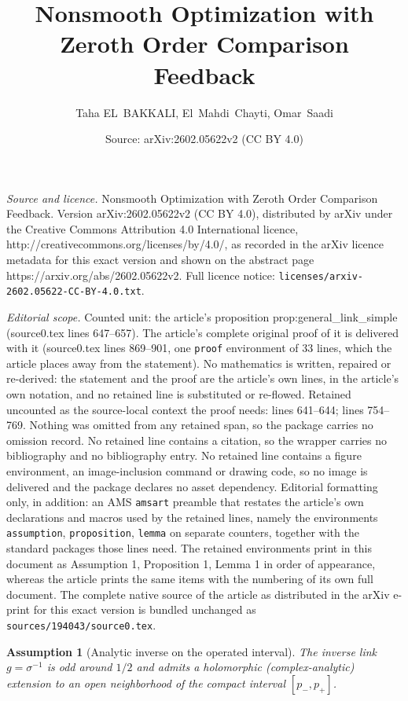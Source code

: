 \documentclass[10pt,a4paper]{amsart}
\title{Nonsmooth Optimization with Zeroth Order Comparison Feedback}
\author{Taha EL~BAKKALI, El~Mahdi~Chayti, Omar~Saadi}
\date{Source: arXiv:2602.05622v2 (CC BY 4.0)}
\newtheorem{assumption}{Assumption}
\begin{document}
\maketitle

\noindent\emph{Source and licence.} Nonsmooth Optimization with Zeroth Order Comparison Feedback. Version arXiv:2602.05622v2 (CC BY 4.0), distributed by arXiv under the Creative Commons Attribution 4.0 International licence, http://creativecommons.org/licenses/by/4.0/, as recorded in the arXiv licence metadata for this exact version and shown on the abstract page https://arxiv.org/abs/2602.05622v2. Full licence notice: \texttt{licenses/arxiv-2602.05622-CC-BY-4.0.txt}.\par\smallskip

\noindent\textit{Editorial scope.} Counted unit: the article's proposition prop:general\_link\_simple (source0.tex lines 647--657). The article's complete original proof of it is delivered with it (source0.tex lines 869--901, one \texttt{proof} environment of 33 lines, which the article places away from the statement). No mathematics is written, repaired or re-derived: the statement and the proof are the article's own lines, in the article's own notation, and no retained line is substituted or re-flowed.  Retained uncounted as the source-local context the proof needs: lines 641--644; lines 754--769.  Nothing was omitted from any retained span, so the package carries no omission record.  No retained line contains a citation, so the wrapper carries no bibliography and no bibliography entry.  No retained line contains a figure environment, an image-inclusion command or drawing code, so no image is delivered and the package declares no asset dependency.  Editorial formatting only, in addition: an AMS \texttt{amsart} preamble that restates the article's own declarations and macros used by the retained lines, namely the environments \texttt{assumption}, \texttt{proposition}, \texttt{lemma} on separate counters, together with the standard packages those lines need.  The retained environments print in this document as Assumption 1, Proposition 1, Lemma 1 in order of appearance, whereas the article prints the same items with the numbering of its own full document.  The complete native source of the article as distributed in the arXiv e-print for this exact version is bundled unchanged as \texttt{sources/194043/source0.tex}.
\begin{assumption}[Analytic inverse on the operated interval]\label{ass:general_link_simple}
The inverse link $g=\sigma^{-1}$ is odd around $1/2$ and admits a holomorphic (complex-analytic) extension
to an open neighborhood of the compact interval $[p_-,p_+]$.
\end{assumption}
\end{document}
